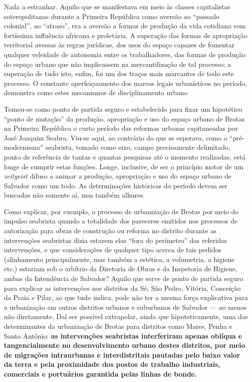 Nada a estranhar. Aquilo que se manifestava em meio às classes capitalistas soteropolitanas durante a Primeira República como aversão ao ``passado colonial'', ao ``atraso'', era a aversão a formas de produção da vida cotidiana com fortíssima influência africana e proletária. A superação das formas de apropriação territorial avessas às regras jurídicas, dos usos do espaço capazes de fomentar qualquer veleidade de autonomia entre os trabalhadores, das formas de produção do espaço urbano que não implicassem na mercantilização de tal processo; a superação de tudo isto, enfim, foi um dos traços mais marcantes de todo este processo. O constante aperfeiçoamento dos marcos legais urbanísticos no período, demonstra como estes mecanismos de disciplinamento urbano 

Tomou-se como ponto de partida seguro e estabelecido para fixar um hipotético ``ponto de mutação'' da produção, apropriação e uso do espaço urbano de Brotas na Primeira República o curto período das reformas urbanas capitaneadas por José Joaquim Seabra. Viu-se aqui, ao contrário do que se esperava, como o ``pré-modernismo'' seabrista, tomado como eixo, campo precisamente delimitado, ponto de referência de tantas e quantas pesquisas até o momento realizadas, está longe de cumprir estas funções. Longe, inclusive, de ser o princípio motor de um \textit{zeitgeist} difuso a animar a produção, apropriação e uso do espaço urbano de Salvador como um todo. As determinações históricas do período devem ser buscadas não somente aí, mas também alhures.

Como explicar, por exemplo, o processo de urbanização de Brotas por meio do impulso seabrista quando a totalidade dos pareceres emitidos nos processos de autorização para obras de construção ou reforma no distrito durante as intervenções seabristas dizia estarem elas ``fora do perímetro'' das referidas intervenções, e que considerações de qualquer tipo acerca de tais pedidos (alinhamento principalmente, mas também a estética, a volumetria, a higiene etc.) estariam sob o arbítrio da Diretoria de Obras e da Inspetoria de Higiene, ambas da Intendência de Salvador? Aquilo que serve de ponto de partida seguro para explicar as intervenções nos distritos da Sé, São Pedro, Vitória, Conceição da Praia e Pilar, ao que tudo indica, pode não ter a mesma força explicativa para a urbanização em outros distritos urbanos e suburbanos de Salvador --- ao menos não diretamente. Daí ser possível extrapolar, ainda que hipoteticamente, uma das determinantes da urbanização de Brotas para distritos como Mares, Penha e Santo Antônio: \textbf{as intervenções seabristas interferiram apenas oblíqua e tangencialmente no desenvolvimento urbano destes distritos, por meio de migrações intraurbanas e interdistritais pautadas pelo baixo valor da terra e pela proximidade dos postos de trabalho industriais, comerciais e portuários garantida pelas linhas de bonde.}

